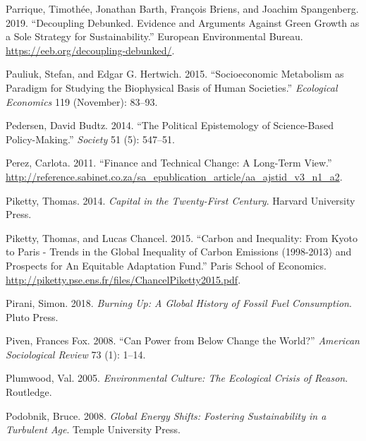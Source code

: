 \documentclass[a4paper, nobind]{templates/ociamthesis}
\newlength{\cslhangindent}
\newenvironment{CSLReferences}[2] %
 {%
  \setlength{\parindent}{0pt}
  \ifodd #1
  \let\oldpar\par
  \def\par{\hangindent=\cslhangindent\oldpar}
  \fi
  \setlength{\parskip}{1mm}
  \setlength{\baselineskip}{6mm}
 }%
 {}
\begin{document}
\begin{CSLReferences}{1}{0}
\leavevmode{}%
Parrique, Timothée, Jonathan Barth, François Briens, and Joachim Spangenberg. 2019. {``Decoupling {Debunked}. {Evidence} and Arguments Against Green Growth as a Sole Strategy for Sustainability.''} {European Environmental Bureau}. \url{https://eeb.org/decoupling-debunked/}.

\leavevmode{}%
Pauliuk, Stefan, and Edgar G. Hertwich. 2015. {``Socioeconomic Metabolism as Paradigm for Studying the Biophysical Basis of Human Societies.''} \emph{Ecological Economics} 119 (November): 83--93.

\leavevmode{}%
Pedersen, David Budtz. 2014. {``The {Political Epistemology} of {Science-Based Policy-Making}.''} \emph{Society} 51 (5): 547--51.

\leavevmode{}%
Perez, Carlota. 2011. {``Finance and Technical Change: A Long-Term View.''} \url{http://reference.sabinet.co.za/sa_epublication_article/aa_ajstid_v3_n1_a2}.

\leavevmode{}%
Piketty, Thomas. 2014. \emph{Capital in the {Twenty-First Century}}. {Harvard University Press}.

\leavevmode{}%
Piketty, Thomas, and Lucas Chancel. 2015. {``Carbon and Inequality: From {Kyoto} to {Paris} - {Trends} in the {Global Inequality} of {Carbon Emissions} (1998-2013) and {Prospects} for {An Equitable Adaptation Fund}.''} {Paris School of Economics}. \url{http://piketty.pse.ens.fr/files/ChancelPiketty2015.pdf}.

\leavevmode{}%
Pirani, Simon. 2018. \emph{Burning {Up}: {A Global History} of {Fossil Fuel Consumption}}. {Pluto Press}.

\leavevmode{}%
Piven, Frances Fox. 2008. {``Can Power from Below Change the World?''} \emph{American Sociological Review} 73 (1): 1--14.

\leavevmode{}%
Plumwood, Val. 2005. \emph{Environmental {Culture}: {The Ecological Crisis} of {Reason}}. {Routledge}.

\leavevmode{}%
Podobnik, Bruce. 2008. \emph{Global {Energy Shifts}: {Fostering Sustainability} in a {Turbulent Age}}. {Temple University Press}.


\end{CSLReferences}
\end{document}
